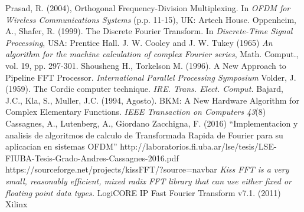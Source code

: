 \documentclass[conference]{IEEEtran}
\begin{document}
\begin{thebibliography}{1}
                 Prasad, R. (2004), Orthogonal Frequency-Division Multiplexing. 
                                    In \textit{OFDM for Wireless Communications Systems} (p.p. 11-15), UK: Artech House.
               Oppenheim, A., Shafer, R. (1999). The Discrete Fourier Transform. In
                                    \textit{Discrete-Time Signal Processing}, USA: Prentice Hall.
                J. W. Cooley and J. W. Tukey (1965) \textit{An algorithm for the machine calculation of complex Fourier series}, 
									Math. Comput., vol. 19, pp. 297-301.
                 Shousheng H., Torkelson M. (1996). A New Approach to Pipeline FFT Processor.
                                    \textit{International Parallel Processing Symposium}
                    Volder, J. (1959). The Cordic computer technique. \textit{IRE. Trans. Elect. Comput.}
                       Bajard, J.C., Kla, S., Muller, J.C. (1994, Agosto). BKM: A New Hardware Algorithm for
                                    Complex Elementary Functions. \textit{IEEE Transaction on Computers 43}(8)
                     Cassagnes, A., Lutenberg, A., Giordano Zacchigna, F. (2016) ``Implementacion y analisis de algoritmos
                                    de calculo de Transformada Rapida de Fourier para su aplicacian en sistemas OFDM''
                                    http://laboratorios.fi.uba.ar/lse/tesis/LSE-FIUBA-Tesis-Grado-Andres-Cassagnes-2016.pdf
                   https://sourceforge.net/projects/kissFFT/?source=navbar \textit{Kiss FFT is a very small, 
                                    reasonably efficient, mixed radix FFT library that can use either fixed or floating point data
                                    types.}
                 LogiCORE IP Fast Fourier Transform v7.1. (2011) Xilinx
\end{thebibliography}
\end{document}
